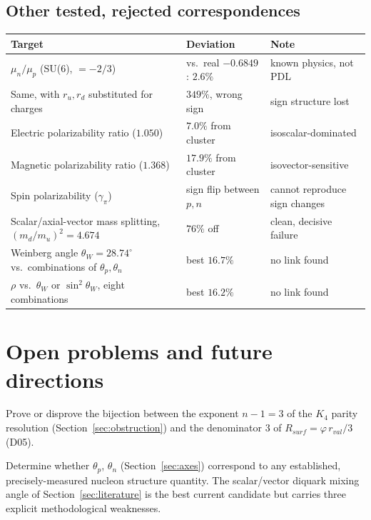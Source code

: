 \documentclass[11pt]{article}
\begin{document}
\subsection{Other tested, rejected correspondences}
\begin{center}
\small
\begin{tabularx}{\textwidth}{YYY}
\toprule
Target & Deviation & Note \\
\midrule
$\mu_n/\mu_p$ (SU(6), $=-2/3$) & vs.\ real $-0.6849$: $2.6\%$ & known physics, not PDL \\
Same, with $r_u,r_d$ substituted for charges & $349\%$, wrong sign & sign structure lost \\
Electric polarizability ratio ($1.050$) & $7.0\%$ from cluster & isoscalar-dominated \\
Magnetic polarizability ratio ($1.368$) & $17.9\%$ from cluster & isovector-sensitive \\
Spin polarizability ($\gamma_\pi$) & sign flip between $p,n$ & cannot reproduce sign changes \\
Scalar/axial-vector mass splitting, $(m_d/m_u)^2=4.674$ & $76\%$ off & clean, decisive failure \\
Weinberg angle $\theta_W=28.74^\circ$ vs.\ combinations of $\theta_p,\theta_n$ & best $16.7\%$ & no link found \\
$\rho$ vs.\ $\theta_W$ or $\sin^2\theta_W$, eight combinations & best $16.2\%$ & no link found \\
\bottomrule
\end{tabularx}
\normalsize
\end{center}

\section{Open problems and future directions}
\label{sec:open}

\begin{openproblembox}[OP-D66-1]
Prove or disprove the bijection between the exponent $n-1=3$ of the $K_4$ parity resolution (Section~\ref{sec:obstruction}) and the denominator $3$ of $R_{surf}=\varphi\,r_{val}/3$ (D05).
\end{openproblembox}

\begin{openproblembox}[OP-D66-2]
Determine whether $\theta_p$, $\theta_n$ (Section~\ref{sec:axes}) correspond to any established, precisely-measured nucleon structure quantity. The scalar/vector diquark mixing angle of Section~\ref{sec:literature} is the best current candidate but carries three explicit methodological weaknesses.
\end{openproblembox}
\end{document}
